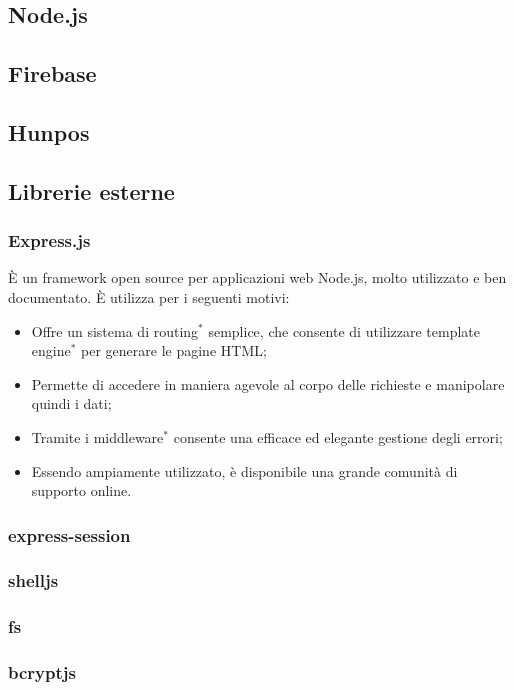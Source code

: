 \subsection{Node.js}
\subsection{Firebase}
\subsection{Hunpos}
\subsection{Librerie esterne}
\subsubsection{Express.js}
È un framework open source per applicazioni web Node.js, molto utilizzato e ben documentato. È utilizza per i seguenti motivi:
\begin{itemize}
 \item Offre un sistema di routing$^*$ semplice, che consente di utilizzare template engine$^*$ per generare le pagine HTML;
 \item Permette di accedere in maniera agevole al corpo delle richieste e manipolare quindi i dati;
 \item Tramite i middleware$^*$ consente una efficace ed elegante gestione degli errori;
 \item Essendo ampiamente utilizzato, è disponibile una grande comunità di supporto online.
 \end{itemize}
\subsubsection{express-session}
\subsubsection{shelljs}
\subsubsection{fs}
\subsubsection{bcryptjs}
